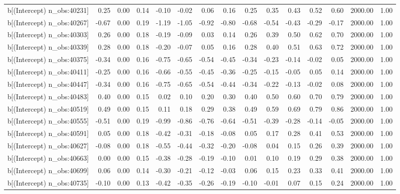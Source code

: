 \begin{table}[ht]
\begin{tabular}{rrrrrrrrrrrrrrr}
  b[(Intercept) n\_obs:40231] & 0.25 & 0.00 & 0.14 & -0.10 & -0.02 & 0.06 & 0.16 & 0.25 & 0.35 & 0.43 & 0.52 & 0.60 & 2000.00 & 1.00 \\ 
  b[(Intercept) n\_obs:40267] & -0.67 & 0.00 & 0.19 & -1.19 & -1.05 & -0.92 & -0.80 & -0.68 & -0.54 & -0.43 & -0.29 & -0.17 & 2000.00 & 1.00 \\ 
  b[(Intercept) n\_obs:40303] & 0.26 & 0.00 & 0.18 & -0.19 & -0.09 & 0.03 & 0.14 & 0.26 & 0.39 & 0.50 & 0.62 & 0.70 & 2000.00 & 1.00 \\ 
  b[(Intercept) n\_obs:40339] & 0.28 & 0.00 & 0.18 & -0.20 & -0.07 & 0.05 & 0.16 & 0.28 & 0.40 & 0.51 & 0.63 & 0.72 & 2000.00 & 1.00 \\ 
  b[(Intercept) n\_obs:40375] & -0.34 & 0.00 & 0.16 & -0.75 & -0.65 & -0.54 & -0.45 & -0.34 & -0.23 & -0.14 & -0.02 & 0.05 & 2000.00 & 1.00 \\ 
  b[(Intercept) n\_obs:40411] & -0.25 & 0.00 & 0.16 & -0.66 & -0.55 & -0.45 & -0.36 & -0.25 & -0.15 & -0.05 & 0.05 & 0.14 & 2000.00 & 1.00 \\ 
  b[(Intercept) n\_obs:40447] & -0.34 & 0.00 & 0.16 & -0.75 & -0.65 & -0.54 & -0.44 & -0.34 & -0.22 & -0.13 & -0.02 & 0.08 & 2000.00 & 1.00 \\ 
  b[(Intercept) n\_obs:40483] & 0.40 & 0.00 & 0.15 & 0.02 & 0.10 & 0.20 & 0.30 & 0.40 & 0.50 & 0.60 & 0.70 & 0.79 & 2000.00 & 1.00 \\ 
  b[(Intercept) n\_obs:40519] & 0.49 & 0.00 & 0.15 & 0.11 & 0.18 & 0.29 & 0.38 & 0.49 & 0.59 & 0.69 & 0.79 & 0.86 & 2000.00 & 1.00 \\ 
  b[(Intercept) n\_obs:40555] & -0.51 & 0.00 & 0.19 & -0.99 & -0.86 & -0.76 & -0.64 & -0.51 & -0.39 & -0.28 & -0.14 & -0.05 & 2000.00 & 1.00 \\ 
  b[(Intercept) n\_obs:40591] & 0.05 & 0.00 & 0.18 & -0.42 & -0.31 & -0.18 & -0.08 & 0.05 & 0.17 & 0.28 & 0.41 & 0.53 & 2000.00 & 1.00 \\ 
  b[(Intercept) n\_obs:40627] & -0.08 & 0.00 & 0.18 & -0.55 & -0.44 & -0.32 & -0.20 & -0.08 & 0.04 & 0.15 & 0.26 & 0.39 & 2000.00 & 1.00 \\ 
  b[(Intercept) n\_obs:40663] & 0.00 & 0.00 & 0.15 & -0.38 & -0.28 & -0.19 & -0.10 & 0.01 & 0.10 & 0.19 & 0.29 & 0.38 & 2000.00 & 1.00 \\ 
  b[(Intercept) n\_obs:40699] & 0.06 & 0.00 & 0.14 & -0.30 & -0.21 & -0.12 & -0.03 & 0.06 & 0.15 & 0.23 & 0.33 & 0.41 & 2000.00 & 1.00 \\ 
  b[(Intercept) n\_obs:40735] & -0.10 & 0.00 & 0.13 & -0.42 & -0.35 & -0.26 & -0.19 & -0.10 & -0.01 & 0.07 & 0.15 & 0.24 & 2000.00 & 1.00 \\ 

\end{tabular}
\end{table}
